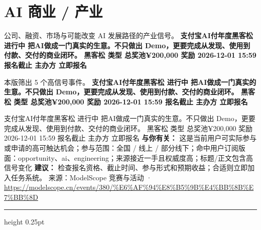 \documentclass[10.5pt]{ctexart}
\begin{document}
\section*{AI 商业 / 产业}
{\color{ormuted} 公司、融资、市场与可能改变 AI 发展路径的产业信号。}
\vspace{2mm}
{\LARGE\bfseries 支付宝AI付年度黑客松 进行中 把AI做成一门真实的生意。不只做出 Demo，更要完成从发现、使用到付款、交付的商业闭环。 黑客松 类型 总奖池¥200,000 奖励 2026-12-01 15:59 报名截止 主办方 立即报名}\par
\vspace{1mm}
{\color{ormuted} 本版筛出 5 个高信号事件。}
\vspace{3mm}
{\Large\bfseries 支付宝AI付年度黑客松 进行中 把AI做成一门真实的生意。不只做出 Demo，更要完成从发现、使用到付款、交付的商业闭环。 黑客松 类型 总奖池¥200,000 奖励 2026-12-01 15:59 报名截止 主办方 立即报名}\par
支付宝AI付年度黑客松 进行中 把AI做成一门真实的生意。不只做出 Demo，更要完成从发现、使用到付款、交付的商业闭环。 黑客松 类型 总奖池¥200,000 奖励 2026-12-01 15:59 报名截止 主办方 立即报名
\textbf{与你有关：} 这是当前用户可实际参与或申请的高可触达机会；参与范围：全国 / 线上 / 部分线下；命中用户订阅版面：opportunity、ai、engineering；来源接近一手且权威度高；标题/正文包含高信号变化
\textbf{建议：} 检查报名资格、截止时间、参与形式和预期收益；合适则立即加入任务系统。
{\footnotesize\color{ormuted} 来源：ModelScope 竞赛与活动 · \url{https://modelscope.cn/events/380/%E6%AF%94%E8%B5%9B%E4%BB%8B%E7%BB%8D}}
\vspace{4mm}
\hrule height 0.25pt
\vspace{3mm}
\end{document}
